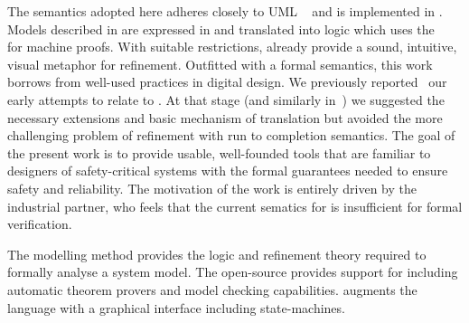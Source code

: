 The semantics adopted here adheres closely to UML \Statecharts~\cite{Alexandre} and is implemented in \iUMLB.
Models described in \Statecharts are expressed in \SCXML and translated into \EventB logic which uses the \Rodin~\cite{abrial10:_rodin} for machine proofs.
With suitable restrictions, \Statecharts already provide a sound, intuitive, visual metaphor for refinement. 
Outfitted with a formal semantics, this work borrows from well-used \Statechart practices in digital design.  
We previously reported~\cite{Morris_2016} our early attempts to relate \Statecharts to \EventB. 
At that stage (and similarly in\mbox{~\cite{Snook12:FMCO}}) we suggested the necessary extensions and basic mechanism of translation but avoided the more challenging problem of refinement with run to completion semantics. 
The goal of the present work is to provide usable, well-founded tools that are familiar to designers of safety-critical systems with the formal guarantees needed to ensure safety and reliability. The motivation of the work is entirely driven by the industrial partner, who feels that the current sematics for \mbox{\Statecharts} is insufficient for formal verification.


The \mbox{\EventB} modelling method provides the logic and refinement
theory required to formally analyse a system model.  The open-source
\mbox{\Rodin} provides support for \mbox{\EventB} including automatic theorem provers and 
model checking capabilities.  
\mbox{\iUMLB} augments the \mbox{\EventB} language with a graphical interface including
state-machines.



